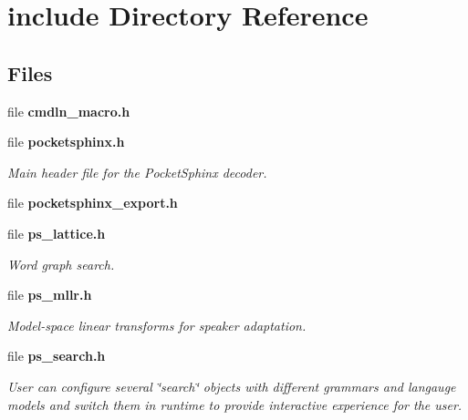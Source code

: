 \section{include Directory Reference}
\label{dir_d44c64559bbebec7f509842c48db8b23}
\subsection*{Files}
\begin{DoxyCompactItemize}
\item 
file {\bfseries cmdln\+\_\+macro.\+h}
\item 
file {\bf pocketsphinx.\+h}
\begin{DoxyCompactList}\small\item\em Main header file for the Pocket\+Sphinx decoder. \end{DoxyCompactList}\item 
file {\bfseries pocketsphinx\+\_\+export.\+h}
\item 
file {\bf ps\+\_\+lattice.\+h}
\begin{DoxyCompactList}\small\item\em Word graph search. \end{DoxyCompactList}\item 
file {\bf ps\+\_\+mllr.\+h}
\begin{DoxyCompactList}\small\item\em Model-\/space linear transforms for speaker adaptation. \end{DoxyCompactList}\item 
file {\bf ps\+\_\+search.\+h}
\begin{DoxyCompactList}\small\item\em User can configure several \char`\"{}search\char`\"{} objects with different grammars and langauge models and switch them in runtime to provide interactive experience for the user. \end{DoxyCompactList}\end{DoxyCompactItemize}
